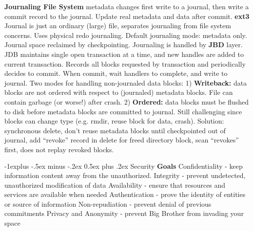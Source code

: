 \documentclass[6pt,landscape]{article}
\makeatletter
\renewcommand{\subsection}{\@startsection{subsection}{2}{0mm}%
                                {-1explus -.5ex minus -.2ex}%
                                {0.5ex plus .2ex}%
                                {\normalfont\normalsize\bfseries}}
\makeatother
\begin{document}
\begin{multicols}{3}
{\bf Journaling File System} metadata changes first write to a journal, then write a commit record to the journal. Update real metadata and data after commit.
{\bf ext3} Journal is just an ordinary (large) file, separates journaling from file system concerns. Uses physical redo journaling. Default journaling mode: metadata only. Journal space reclaimed by checkpointing.
Journaling is handled by {\bf JBD} layer. JDB maintains single open transaction at a time, and new handles are added to current transaction. Records all blocks requested by transaction and periodically decides to commit. When commit, wait handlers to complete, and write to journal.
Two modes for handling non-journaled data blocks: 1) {\bf Writeback:} data blocks are not ordered with respect to (journaled) metadata blocks. File can contain garbage (or worse!) after crash.
2) {\bf Ordered:} data blocks must be flushed to disk before metadata blocks are committed to journal. Still challenging since blocks can change type (e.g. rmdir, reuse block for data, crash). Solution: synchronous delete, don't reuse metadata blocks until checkpointed out of journal, add ``revoke'' record in delete for freed directory block, scan ``revokes'' first, does not replay revoked blocks.



\subsection{Security}
{\bf Goals} Confidentiality - keep information content away from the unauthorized.
Integrity - prevent undetected, unauthorized modification of data
Availability - ensure that resources and services are available when needed
Authentication - prove the identity of entities or source of information
Non-repudiation - prevent denial of previous commitments
Privacy and Anonymity - prevent Big Brother from invading your space


\end{multicols}
\end{document}
